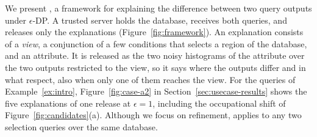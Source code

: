 We present \sys{}, a framework for explaining the difference between two query outputs under $\epsilon$-DP.
A trusted server holds the database, receives both queries, and releases only the explanations (Figure~\ref{fig:framework}).
An explanation consists of a \emph{view}, a conjunction of a few conditions that selects a region of the database, and an attribute.
It is released as the two noisy histograms of the attribute over the two outputs restricted to the view, so it says where the outputs differ and in what respect, also when only one of them reaches the view.
For the queries of Example~\ref{ex:intro}, Figure~\ref{fig:case-a2} in Section~\ref{sec:usecase-results} shows the five explanations of one release at $\epsilon=1$, including the occupational shift of Figure~\ref{fig:candidates}(a).
Although we focus on refinement, \sys{} applies to any two selection queries over the same database.



